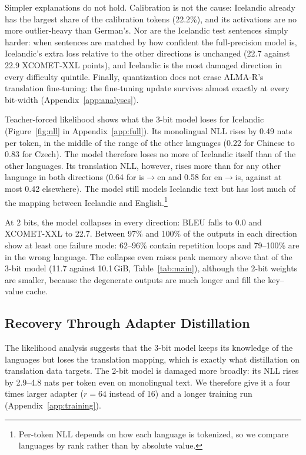\documentclass[10pt]{article}
\begin{document}
Simpler explanations do not hold. Calibration is not the cause: Icelandic
already has the largest share of the calibration tokens (22.2\%), and its
activations are no more outlier-heavy than German's. Nor are the Icelandic test
sentences simply harder: when sentences are matched by how confident the
full-precision model is, Icelandic's extra loss relative to the other
directions is unchanged (22.7 against 22.9 XCOMET-XXL points), and Icelandic is
the most damaged direction in every difficulty quintile. Finally, quantization
does not erase ALMA-R's translation fine-tuning: the fine-tuning update
survives almost exactly at every bit-width (Appendix~\ref{app:analyses}).

Teacher-forced likelihood shows what the 3-bit model loses for Icelandic
(Figure~\ref{fig:nll} in Appendix~\ref{app:full}). Its
monolingual NLL rises by 0.49 nats per token, in the middle of the range of the
other languages (0.22 for Chinese to 0.83 for Czech). The model therefore loses
no more of Icelandic itself than of the other languages. Its translation NLL,
however, rises more than for any other language in both directions (0.64 for
is$\rightarrow$en and 0.58 for en$\rightarrow$is, against at most 0.42
elsewhere). The model still models Icelandic text but has lost much of the
mapping between Icelandic and English.\footnote{Per-token NLL depends on how each
language is tokenized, so we compare languages by rank rather than by absolute
value.}

At 2 bits, the model collapses in every direction: BLEU falls to 0.0 and
XCOMET-XXL to 22.7. Between 97\% and 100\% of the outputs in each direction
show at least one failure mode: 62--96\% contain repetition loops and 79--100\%
are in the wrong language.
The collapse even raises peak memory above that of the 3-bit model (11.7
against 10.1\,GiB, Table~\ref{tab:main}), although the 2-bit weights are
smaller, because the degenerate outputs are much longer and fill the key--value
cache.

\subsection{Recovery Through Adapter Distillation}
\label{sec:recovery}

The likelihood analysis suggests that the 3-bit model keeps its knowledge of the
languages but loses the translation mapping, which is exactly what distillation
on translation data targets. The 2-bit model is damaged more broadly: its NLL
rises by 2.9--4.8 nats per token even on monolingual text. We therefore give it a
four times larger adapter ($r=64$ instead of 16) and a longer training run
(Appendix~\ref{app:training}).
\end{document}
